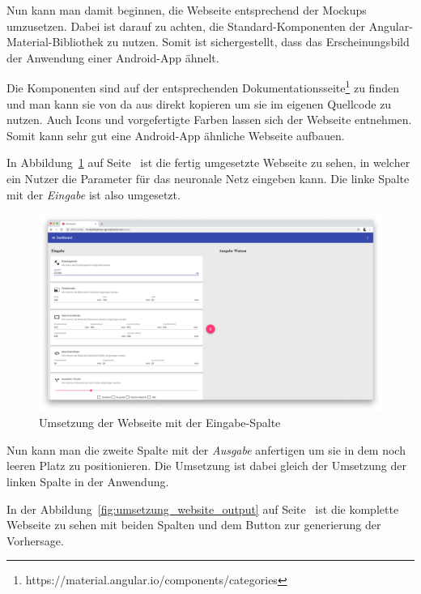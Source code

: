 Nun kann man damit beginnen, die Webseite entsprechend der Mockups umzusetzen. Dabei ist darauf zu achten, die
Standard-Komponenten der Angular-Material-Bibliothek zu nutzen. Somit ist sichergestellt, dass das Erscheinungsbild der
Anwendung einer Android-App ähnelt.

Die Komponenten sind auf der entsprechenden Dokumentationsseite\footnote{https://material.angular.io/components/categories}
zu finden und man kann sie von da aus direkt kopieren um sie im eigenen Quellcode zu nutzen. Auch Icons und
vorgefertigte Farben lassen sich der Webseite entnehmen. Somit kann sehr gut eine Android-App ähnliche Webseite
aufbauen.

In Abbildung~\ref{fig:umsetzung_website_input} auf Seite~\pageref{fig:umsetzung_website_input} ist die fertig
umgesetzte Webseite zu sehen, in welcher ein Nutzer die Parameter für das neuronale Netz eingeben kann. Die linke Spalte
mit der \textit{Eingabe} ist also umgesetzt.

\begin{figure}[h]
    \centering
    \includegraphics[width=\textwidth]{images/kapitel_4/website_input.png}
    \caption{Umsetzung der Webseite mit der Eingabe-Spalte}
    \label{fig:umsetzung_website_input}
\end{figure}

Nun kann man die zweite Spalte mit der \textit{Ausgabe} anfertigen um sie in dem noch leeren Platz zu positionieren. Die
Umsetzung ist dabei gleich der Umsetzung der linken Spalte in der Anwendung.

In der Abbildung~\ref{fig:umsetzung_website_output} auf Seite~\pageref{fig:umsetzung_website_output} ist die komplette
Webseite zu sehen mit beiden Spalten und dem Button zur generierung der Vorhersage.

